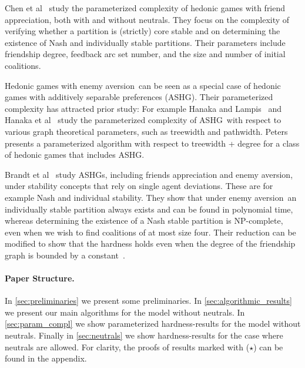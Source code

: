 \documentclass[a4paper,fleqn]{cas-sc}
\newcommand{\enemyav}{enemy aversion}
\newcommand{\ashg}{ASHG}
\newcommand{\appsymb}{$\star$}
\begin{document}
Chen et al~\cite{CheCsaRoySim2023Verif} study the parameterized complexity of hedonic games with friend appreciation, both with and without neutrals. 
They focus on the complexity of verifying whether a partition is (strictly) core stable and on determining the existence of Nash and individually stable partitions.
Their parameters include friendship degree, feedback arc set number, and the size and number of initial coalitions.

Hedonic games with \enemyav\ can be seen as a special case of hedonic games with additively separable preferences (\ashg). Their parameterized complexity has attracted prior study: For example Hanaka and Lampis~\cite{hanaka2022tree} and Hanaka et al~\cite{hanaka2024core} study the parameterized complexity of \ashg\ with respect to various graph theoretical parameters, such as treewidth and pathwidth. 
Peters~\cite{peters2016graphical} presents a parameterized algorithm with respect to treewidth + degree for a class of hedonic games that includes \ashg.

Brandt et al~\cite{brandt2024stability} study \ashg s, including friends appreciation and \enemyav, under stability concepts that rely on single agent deviations. These are for example Nash and individual stability.
They show that under \enemyav\ an individually stable partition always exists and can be found in polynomial time, whereas determining the existence of a Nash stable partition is NP-complete, even when we wish to find coalitions of at most size four. Their reduction can be modified to show that the hardness holds even when the degree of the friendship graph is bounded by a constant~\cite{comsocsurvey}.

\paragraph{Paper Structure.}
In \cref{sec:preliminaries} we present some preliminaries.
In \cref{sec:algorithmic_results} we present our main algorithms for the model without neutrals.
In \cref{sec:param_compl} we show parameterized hardness-results for the model without neutrals.
Finally in \cref{sec:neutrals} we show hardness-results for the case where neutrals are allowed.
For clarity, the proofs of results marked with (\appsymb) can be found in the appendix.
\end{document}
